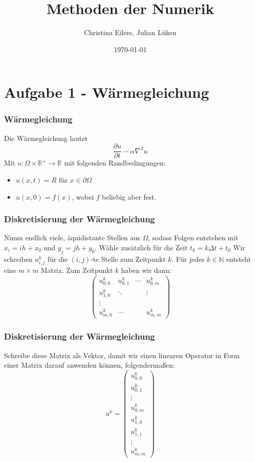 \documentclass[xcolor = dvipsnames, notheorems, 10pt]{beamer}
\title{Methoden der Numerik}
\date{\today}
\author{Christina Eilers, Julian Lüken}
\institute{Mathematisches Institut Göttingen}
\theoremstyle{definition}
\begin{document}
\begin{frame}
	\maketitle
\end{frame}

\section{Aufgabe 1 - Wärmegleichung}
\begin{frame}
\frametitle{Wärmegleichung}
	Die Wärmegleichung lautet
	$$ \frac{\partial u}{\partial t} - \alpha \nabla^2 u$$
	Mit $u: \Omega \times \mathbb{R}^+ \rightarrow \mathbb{R}$ mit folgenden Randbedingungen:
	\begin{itemize}
		\item $ u(x,t) = R$ für $ x \in \partial \Omega$	
		\item $ u(x,0) = f(x) $, wobei $f$ beliebig aber fest.
	\end{itemize}
\end{frame}

\begin{frame}
\frametitle{Diskretisierung der Wärmegleichung}
	Nimm endlich viele, äquidistante Stellen aus $\Omega$, sodass Folgen entstehen mit $x_i = ih + x_0$ und $y_j = jh + y_0$. Wähle zusätzlich für die Zeit $t_k = k\Delta t + t_0$ Wir schreiben $u_{i,j}^k$ für die $(i,j)$-te Stelle zum Zeitpunkt $k$. Für jedes $k \in \mathbb{N}$ entsteht eine $m \times m$ Matrix. Zum Zeitpunkt $k$ haben wir dann:
	$$
	\begin{pmatrix}
		u^k_{0,0}& 		u^k_{0,1}& \cdots & u^k_{0,m} 	\\
		u^k_{1,0}&		\ddots&			&\vdots	\\
		\vdots & & &	\\
		u^k_{m,0}&	\cdots	&			 & u^k_{m,m}
	\end{pmatrix}
	$$
\end{frame}
\begin{frame}
\frametitle{Diskretisierung der Wärmegleichung}
	Schreibe diese Matrix als Vektor, damit wir einen linearen Operator in Form einer Matrix darauf anwenden können, folgendermaßen:
	$$ u^k =
	\begin{pmatrix}
		u^k_{0,0} \\
		u^k_{0,1} \\
		\vdots \\
		u^k_{0,m} \\
		u^k_{1,0} \\
		u^k_{1,1} \\
		\vdots \\
		u^k_{m,m}
	\end{pmatrix}
	$$
\end{frame}
\end{document}
